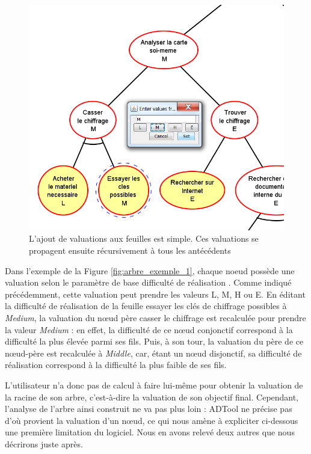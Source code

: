 	\begin{figure}[h]
        \centering
        \includegraphics[width=1\textwidth]{figure/adtool_add_values.png}
        \caption{L'ajout de valuations aux feuilles est simple. Ces valuations se propagent ensuite récursivement à tous les antécédents }
        \label{fig:arbre_exemple_2}
    \end{figure}
	
	Dans l'exemple de la {\sc Figure} \ref{fig:arbre_exemple_1}, chaque noeud possède une valuation selon le paramètre de base \og difficulté de réalisation \fg{}. Comme indiqué précédemment, cette valuation peut prendre les valeurs L, M, H ou E. En éditant la difficulté de réalisation de la feuille \og essayer les clés de chiffrage possibles \fg{}  à \emph{Medium}, la valuation du nœud père \og casser le chiffrage \fg{} est recalculée pour prendre la valeur \emph{Medium} : en effet, la difficulté de ce nœud conjonctif correspond à la difficulté la plus élevée parmi ses fils. Puis, à son tour, la valuation du père de ce nœud-père est recalculée à \emph{Middle}, car, étant un nœud disjonctif, sa difficulté de réalisation correspond à la difficulté la plus faible de ses fils.
	
	L'utilisateur n'a donc pas de calcul à faire lui-même pour obtenir la valuation de la racine de son arbre, c'est-à-dire la valuation de son objectif final. Cependant, l'analyse de l'arbre ainsi construit ne va pas plus loin : ADTool ne précise pas d'où provient la valuation d'un nœud, ce qui nous amène à expliciter ci-dessous une première limitation du logiciel. Nous en avons relevé deux autres que nous décrirons juste après.\\

